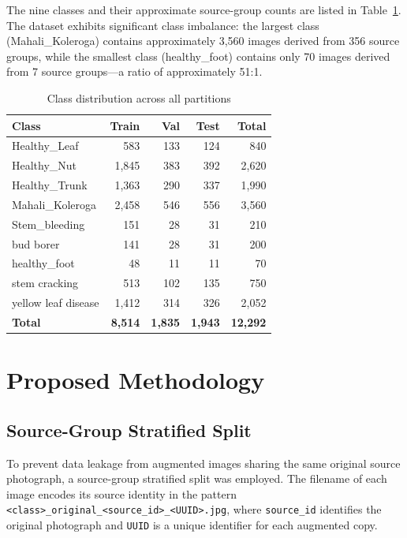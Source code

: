 \documentclass[conference]{IEEEtran}
\begin{document}
The nine classes and their approximate source-group counts are listed in Table~\ref{tab:classes}. The dataset exhibits significant class imbalance: the largest class (Mahali\_Koleroga) contains approximately 3{,}560 images derived from 356 source groups, while the smallest class (healthy\_foot) contains only 70 images derived from 7 source groups---a ratio of approximately 51:1.

\begin{table}[htbp]
\caption{Class distribution across all partitions}
\label{tab:classes}
\centering
\small
\begin{tabular}{l|r|r|r|r}
\toprule
\textbf{Class} & \textbf{Train} & \textbf{Val} & \textbf{Test} & \textbf{Total} \\
\midrule
Healthy\_Leaf        & 583 & 133 & 124 & 840 \\
Healthy\_Nut          & 1{,}845 & 383 & 392 & 2{,}620 \\
Healthy\_Trunk        & 1{,}363 & 290 & 337 & 1{,}990 \\
Mahali\_Koleroga      & 2{,}458 & 546 & 556 & 3{,}560 \\
Stem\_bleeding        & 151 & 28 & 31 & 210 \\
bud borer             & 141 & 28 & 31 & 200 \\
healthy\_foot         & 48 & 11 & 11 & 70 \\
stem cracking         & 513 & 102 & 135 & 750 \\
yellow leaf disease   & 1{,}412 & 314 & 326 & 2{,}052 \\
\midrule
\textbf{Total}        & \textbf{8{,}514} & \textbf{1{,}835} & \textbf{1{,}943} & \textbf{12{,}292} \\
\bottomrule
\end{tabular}
\end{table}

\section{Proposed Methodology}
\label{sec:methodology}

\subsection{Source-Group Stratified Split}

To prevent data leakage from augmented images sharing the same original source photograph, a source-group stratified split was employed. The filename of each image encodes its source identity in the pattern \texttt{<class>\_original\_<source\_id>\_<UUID>.jpg}, where \texttt{source\_id} identifies the original photograph and \texttt{UUID} is a unique identifier for each augmented copy.
\end{document}
